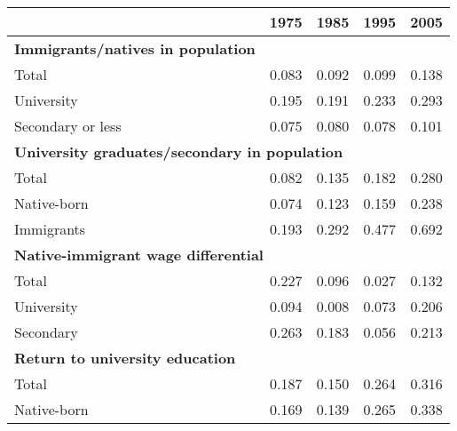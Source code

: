 {\def\sym#1{\ifmmode^{#1}\else\(^{#1}\)\fi} \begin{tabular}{l*{4}{c}} \toprule
&\multicolumn{1}{c}{1975}&\multicolumn{1}{c}{1985}&\multicolumn{1}{c}{1995}&\multicolumn{1}{c}{2005}\\
\midrule \textbf{Immigrants/natives in population}\\
\hspace{2cm}Total&               0.083&               0.092&               0.099&               0.138\\
\hspace{2cm}University&               0.195&               0.191&               0.233&               0.293\\
\hspace{2cm}Secondary or less&               0.075&               0.080&               0.078&               0.101\\
\multicolumn{5}{l}{\textbf{University graduates/secondary in population}}\\
\hspace{2cm}Total   &               0.082&               0.135&               0.182&               0.280\\
\hspace{2cm}Native-born&               0.074&               0.123&               0.159&               0.238\\
\hspace{2cm}Immigrants&               0.193&               0.292&               0.477&               0.692\\
\multicolumn{5}{l}{\textbf{Native-immigrant wage differential}}\\
\hspace{2cm}Total   &               0.227&               0.096&               0.027&               0.132\\
\hspace{2cm}University&               0.094&               0.008&               0.073&               0.206\\
\hspace{2cm}Secondary&               0.263&               0.183&               0.056&               0.213\\
\multicolumn{5}{l}{\textbf{Return to university education}}\\
\hspace{2cm}Total   &               0.187&               0.150&               0.264&               0.316\\
\hspace{2cm}Native-born&               0.169&               0.139&               0.265&               0.338\\

\end{tabular}}

